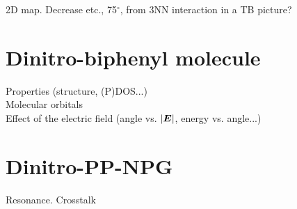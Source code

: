 2D map. Decrease etc., 75\(^{\circ}\), from 3NN interaction in a TB picture?


\section{Dinitro-biphenyl molecule}
Properties (structure, (P)DOS...)\\
Molecular orbitals\\
Effect of the electric field (angle vs. \(\abs{\bm E}\), energy vs. angle...)


\section{Dinitro-PP-NPG}
Resonance. Crosstalk

